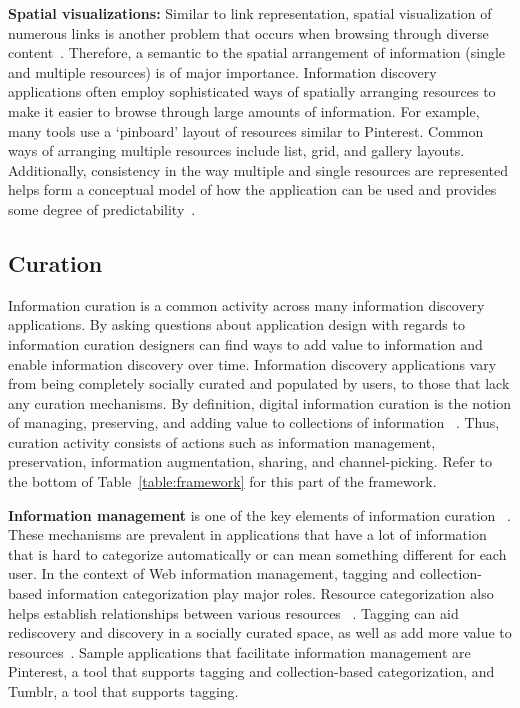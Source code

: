 \documentclass{sigchi}
\newcommand{\feature}[1]{{\ttfamily#1}}
\begin{document}
{{\textbf{Spatial visualizations:} Similar to link representation, spatial visualization of numerous links is another problem that occurs when browsing through diverse content~\cite{abrams1998information}. Therefore, a semantic to the \feature{spatial arrangement} of information (single and multiple resources) is of major importance. Information discovery applications often employ sophisticated ways of spatially arranging resources to make it easier to browse through large amounts of information. For example, many tools use a `pinboard' layout of resources similar to Pinterest. Common ways of arranging multiple resources include list, grid, and gallery layouts. Additionally, \feature{consistency} in the way multiple and single resources are represented helps form a conceptual model of how the application can be used and provides some degree of predictability~\cite{norman2002design}.
} %

{\subsection{Curation}
Information curation is a common activity across many information discovery applications. By asking questions about application design with regards to information curation designers can find ways to add value to information and enable information discovery over time. 
%
Information discovery applications vary from being completely socially curated and populated by users, to those that lack any curation mechanisms. 
By definition, digital information curation is the notion of managing, preserving, and adding value to collections of information ~\cite{beagrie2008digital,whittaker2011personal}. Thus, curation activity consists of actions such as information management, preservation, information augmentation, sharing, and channel-picking. Refer to the bottom of Table~\ref{table:framework} for this part of the framework.

\textbf{
Information management} is one of the key elements of information curation ~\cite{beagrie2008digital,whittaker2011personal}. These mechanisms are prevalent in applications that have a lot of information that is hard to categorize automatically or can mean something different for each user. In the context of Web information management, \feature{tagging} and \feature{collection-based} information categorization play major roles.
%
Resource categorization also helps establish relationships between various resources ~\cite{beagrie2008digital,whittaker2011personal}. Tagging can aid rediscovery and discovery in a socially curated space, as well as add more value to resources~\cite{gruber2007ontology}. Sample applications that facilitate information management are Pinterest, a tool that supports tagging and collection-based categorization, and Tumblr, a tool that supports tagging.

}}
\end{document}
